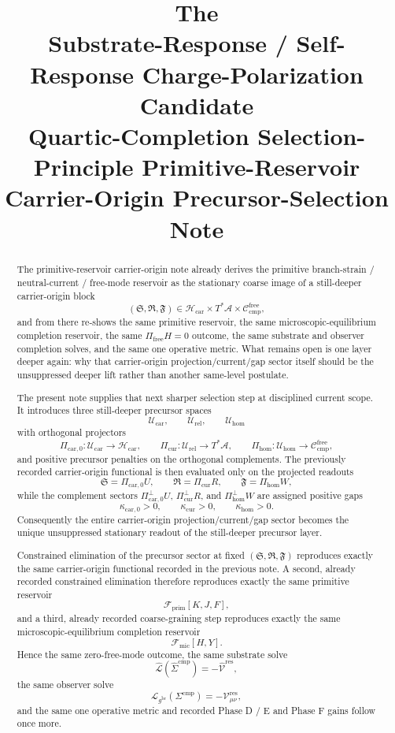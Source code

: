 \documentclass[11pt]{article}
\title{\textbf{The \TheoryName{}}\\[0.4em]
\large Substrate-Response / Self-Response Charge-Polarization Candidate\\
\large Quartic-Completion Selection-Principle Primitive-Reservoir Carrier-Origin Precursor-Selection Note}
\author{}
\date{}
\newcommand{\Sub}{\mathcal A}
\newcommand{\ObserverMetric}{g^{\mathrm{br}}}
\newcommand{\CompShift}{\Sigma^{\mathrm{cmp}}}
\newcommand{\CompLift}{\widehat\Sigma^{\mathrm{cmp}}}
\newcommand{\ResidualCore}{\mathcal V_{\mu\nu}^{\mathrm{res}}}
\newcommand{\ResidualLift}{\widehat{\mathcal V}^{\mathrm{res}}}
\newcommand{\SubReducedEin}{\widehat{\mathcal L}}
\newcommand{\GaugeAux}{Y}
\newcommand{\ReducedEin}{\mathcal L_{\ObserverMetric}}
\newcommand{\CompFree}{\mathscr C_{\mathrm{cmp}}^{\mathrm{free}}}
\newcommand{\MicFunctional}{\mathscr F_{\mathrm{mic}}}
\newcommand{\PrimFunctional}{\mathscr F_{\mathrm{prim}}}
\newcommand{\PrimStrain}{K}
\newcommand{\PrimNeutral}{J}
\newcommand{\PrimFree}{F}
\newcommand{\CarrierClass}{\mathscr H_{\mathrm{car}}}
\newcommand{\CarrierSeed}{\mathfrak S}
\newcommand{\RelabelSeed}{\mathfrak R}
\newcommand{\FreeSeed}{\mathfrak F}
\newcommand{\PreTensorClass}{\mathscr U_{\mathrm{car}}}
\newcommand{\PreRelabelClass}{\mathscr U_{\mathrm{rel}}}
\newcommand{\PreFreeClass}{\mathscr U_{\mathrm{hom}}}
\newcommand{\PreTensor}{U}
\newcommand{\PreRelabel}{R}
\newcommand{\PreFree}{W}
\newcommand{\PreCarProj}{\Pi_{\mathrm{car},0}}
\newcommand{\PreCarPerp}{\Pi_{\mathrm{car},0}^{\perp}}
\newcommand{\CurrentProj}{\Pi_{\mathrm{cur}}}
\newcommand{\CurrentPerp}{\Pi_{\mathrm{cur}}^{\perp}}
\newcommand{\FreeReadProj}{\Pi_{\mathrm{hom}}}
\newcommand{\FreeReadPerp}{\Pi_{\mathrm{hom}}^{\perp}}
\newcommand{\PreCarGap}{\kappa_{\mathrm{car},0}}
\newcommand{\CurrentGap}{\kappa_{\mathrm{cur}}}
\newcommand{\HomGap}{\kappa_{\mathrm{hom}}}
\begin{document}
\maketitle

\begin{abstract}
The primitive-reservoir carrier-origin note already derives the primitive branch-strain / neutral-current / free-mode reservoir as the stationary coarse image of a still-deeper carrier-origin block
\[
(\CarrierSeed,\RelabelSeed,\FreeSeed)\in
\CarrierClass\times T^*\Sub\times \CompFree,
\]
and from there re-shows the same primitive reservoir, the same microscopic-equilibrium completion reservoir, the same \(\Pi_{\mathrm{free}}H=0\) outcome, the same substrate and observer completion solves, and the same one operative metric. What remains open is one layer deeper again: why that carrier-origin projection/current/gap sector itself should be the unsuppressed deeper lift rather than another same-level postulate.

The present note supplies that next sharper selection step at disciplined current scope. It introduces three still-deeper precursor spaces
\[
\PreTensorClass,\qquad \PreRelabelClass,\qquad \PreFreeClass
\]
with orthogonal projectors
\[
\PreCarProj:\PreTensorClass\to\CarrierClass,
\qquad
\CurrentProj:\PreRelabelClass\to T^*\Sub,
\qquad
\FreeReadProj:\PreFreeClass\to\CompFree,
\]
and positive precursor penalties on the orthogonal complements. The previously recorded carrier-origin functional is then evaluated only on the projected readouts
\[
\CarrierSeed=\PreCarProj\PreTensor,\qquad
\RelabelSeed=\CurrentProj\PreRelabel,\qquad
\FreeSeed=\FreeReadProj\PreFree,
\]
while the complement sectors \(\PreCarPerp\PreTensor\), \(\CurrentPerp\PreRelabel\), and \(\FreeReadPerp\PreFree\) are assigned positive gaps
\[
\PreCarGap>0,\qquad \CurrentGap>0,\qquad \HomGap>0.
\]
Consequently the entire carrier-origin projection/current/gap sector becomes the unique unsuppressed stationary readout of the still-deeper precursor layer.

Constrained elimination of the precursor sector at fixed \((\CarrierSeed,\RelabelSeed,\FreeSeed)\) reproduces exactly the same carrier-origin functional recorded in the previous note. A second, already recorded constrained elimination therefore reproduces exactly the same primitive reservoir
\[
\PrimFunctional[\PrimStrain,\PrimNeutral,\PrimFree],
\]
and a third, already recorded coarse-graining step reproduces exactly the same microscopic-equilibrium completion reservoir
\[
\MicFunctional[H,\GaugeAux].
\]
Hence the same zero-free-mode outcome, the same substrate solve
\[
\SubReducedEin(\CompLift)=-\ResidualLift,
\]
the same observer solve
\[
\ReducedEin(\CompShift)=-\ResidualCore,
\]
and the same one operative metric and recorded Phase D / E and Phase F gains follow once more.


\end{abstract}
\end{document}
